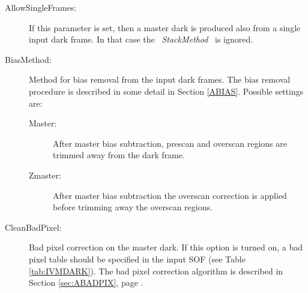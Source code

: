 \begin{description}

\item [AllowSingleFrames:]  If this parameter is set, then a master dark
                        is produced also from a single input dark frame.
                        In that case the \ {\it StackMethod} \ is ignored.


\item [BiasMethod:]     Method for bias removal from the input dark frames.
                        The bias removal procedure is described in some
                        detail in Section \ref{ABIAS}. Possible settings are:

\begin{description}
  \item [Master:]       After master bias subtraction, prescan and
                        overscan regions are trimmed away from the
                        dark frame.

  \item [Zmaster:]      After master bias subtraction the overscan correction
                        is applied before trimming away the overscan regions.
\end{description}

\item [CleanBadPixel:]  Bad pixel correction on the master dark.
                        If this option is turned on, a bad pixel
                        table should be specified in the input SOF
                        (see Table \ref{tab:IVMDARK}). The bad pixel
                        correction algorithm is described in Section
                        \ref{sec:ABADPIX}, page \pageref{sec:ABADPIX}.


\end{description}
